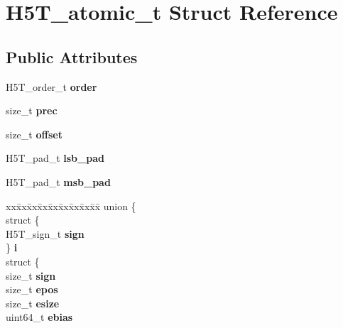 \hypertarget{struct_h5_t__atomic__t}{}\section{H5\+T\+\_\+atomic\+\_\+t Struct Reference}
\label{struct_h5_t__atomic__t}
\subsection*{Public Attributes}
\begin{DoxyCompactItemize}
\item 
\mbox{\label{struct_h5_t__atomic__t_a6f3a8941ef873072c8e594919c4d1a07}} 
H5\+T\+\_\+order\+\_\+t {\bfseries order}
\item 
\mbox{\label{struct_h5_t__atomic__t_a5aad571e8dd03de63e4f36b05c9e8c16}} 
size\+\_\+t {\bfseries prec}
\item 
\mbox{\label{struct_h5_t__atomic__t_ac33b75e26c597a19a220d954ab668de4}} 
size\+\_\+t {\bfseries offset}
\item 
\mbox{\label{struct_h5_t__atomic__t_a6c8011ea786e2f61fc6883ab3ed66113}} 
H5\+T\+\_\+pad\+\_\+t {\bfseries lsb\+\_\+pad}
\item 
\mbox{\label{struct_h5_t__atomic__t_a00d7ae3a45a44e8993f2fdaca7f233e9}} 
H5\+T\+\_\+pad\+\_\+t {\bfseries msb\+\_\+pad}
\item 
\mbox{\label{struct_h5_t__atomic__t_abeb61309ae3a751df6199d69a7b72797}} 
\begin{tabbing}
xx\=xx\=xx\=xx\=xx\=xx\=xx\=xx\=xx\=\kill
union \{\\
\>struct \{\\
\>\>H5T\_sign\_t {\bfseries sign}\\
\>\} {\bfseries i}\\
\>struct \{\\
\>\>size\_t {\bfseries sign}\\
\>\>size\_t {\bfseries epos}\\
\>\>size\_t {\bfseries esize}\\
\>\>uint64\_t {\bfseries ebias}\\

\end{tabbing}
\end{DoxyCompactItemize}
